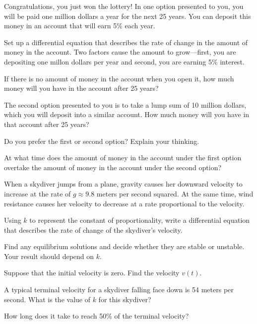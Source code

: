 \begin{exercises} 
  \item  Congratulations, you just won the lottery!  In one option
    presented to you, you will be paid one million dollars a year for
    the next 25 years.  You can deposit this money in an account that
    will earn 5\% each year.

    \ba
  \item Set up a differential equation that describes the rate of
    change in the amount of money in the account.  Two factors cause
    the amount to grow---first, you are depositing one millon dollars
    per year and second, you are earning 5\% interest.

  \item If there is no amount of money in the account when you open
    it, how much money will you have in the account after 25 years?

  \item The second option presented to you is to take a lump sum of 10
    million dollars, which you will deposit into a similar account.  How
    much money will you have in that account after 25 years?

  \item Do you prefer the first or second option?  Explain your thinking. 

  \item At what time does the amount of money in the account under the
    first option overtake the amount of money in the account under the
    second option?
    \ea

  \item When a skydiver jumps from a plane, gravity causes 
    her downward velocity to increase at the rate of $g\approx 9.8$
    meters per second squared.  At the same time, wind resistance
    causes her velocity to decrease at a rate proportional to the
    velocity.  

    \ba
    \item Using $k$ to represent the constant of proportionality,
      write a differential equation that describes the rate of change
      of the skydiver's velocity.
    \item Find any equilibrium solutions and decide whether they are
        stable or unstable.  Your result should depend on $k$.
      \item Suppose that the initial velocity is zero.  Find the
        velocity $v(t)$.
      \item A typical terminal velocity for a skydiver falling face
        down is 54 meters per second.  What is the value of $k$ for
        this skydiver?
      \item How long does it take to reach 50\% of the terminal
        velocity? 
      \ea


\end{exercises}
